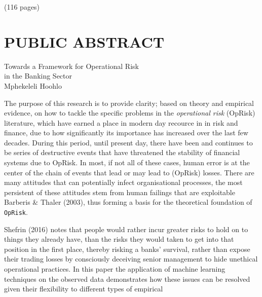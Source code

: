 \documentclass{DissertateUSU}
\begin{document}
\hspace{11 cm}

(116 pages)

\singlespacing

\newpage
{}
\fancyhead[R]{\thepage}
\fancyfoot[C]{}
\chapter*{PUBLIC ABSTRACT}

\doublespacing
\begin{center}
Towards a Framework for Operational Risk \\ 
in the Banking Sector \\
Mphekeleli Hoohlo
\end{center}

\vspace{12pt}

The purpose of this research is to provide clarity; based on theory and
empirical evidence, on how to tackle the specific problems in the
\emph{operational risk} (OpRisk) literature, which have earned a place
in modern day recource in in risk and finance, due to how significantly
its importance has increased over the last few decades. During this
period, until present day, there have been and continues to be series of
destructive events that have threatened the stability of financial
systems due to OpRisk. In most, if not all of these cases, human error
is at the center of the chain of events that lead or may lead to
(OpRisk) losses. There are many attitudes that can potentially infect
organisational processes, the most persistent of these attitudes stem
from human failings that are exploitable Barberis \& Thaler (2003), thus
forming a basis for the theoretical foundation of \texttt{OpRisk}.

Shefrin (2016) notes that people would rather incur greater risks to
hold on to things they already have, than the risks they would taken to
get into that position in the first place, thereby risking a banks'
survival, rather than expose their trading losses by consciously
deceiving senior management to hide unethical operational practices. In
this paper the application of machine learning techniques on the
observed data demonstrates how these issues can be resolved given their
flexibility to different types of empirical

\singlespacing

\newpage
{}
\fancyhead[R]{\thepage}
\fancyfoot[C]{}
\end{document}
